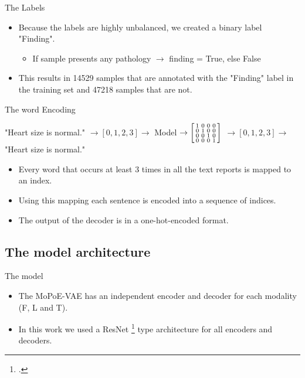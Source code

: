     \begin{frame}{The Labels}
    \pause
    \begin{itemize}
        \item Because the labels are highly unbalanced, we created a binary label "Finding".
        \begin{itemize}
            \item If sample presents any pathology $\rightarrow$ finding = True, else False
        \end{itemize}
        \item This results in 14529 samples that are annotated with the "Finding" label in the training set and 47218 samples that are not.
    \end{itemize}
    \end{frame}

    \begin{frame}{The word Encoding}
        
        \small{
        "Heart size is normal." $\rightarrow [0,1,2,3] \rightarrow$ Model $\rightarrow
        \begin{bsmallmatrix}
            1 & 0 & 0 & 0\\
            0 & 1 & 0 & 0\\
            0 & 0 & 1 & 0\\
            0 & 0 & 0 & 1\\
        \end{bsmallmatrix}$
        $\rightarrow [0,1,2,3] \rightarrow$ "Heart size is normal."}\\
        \vspace{\baselineskip}
        \pause
        \begin{itemize}
            \item Every word that occurs at least 3 times in all the text reports is mapped to an index. 
            \pause
            \item Using this mapping each sentence is encoded into a sequence of indices.
            \pause
            \item The output of the decoder is in a one-hot-encoded format.
        \end{itemize}
    \end{frame}

    \subsection{The model architecture}
    \begin{frame}{The model}
        \begin{itemize}
            \item The MoPoE-VAE has an independent encoder and decoder for each modality (F, L and T).
            \item In this work we used a ResNet \footcite{he2016deep} type architecture for all encoders and decoders.
        \end{itemize}

    \end{frame}

